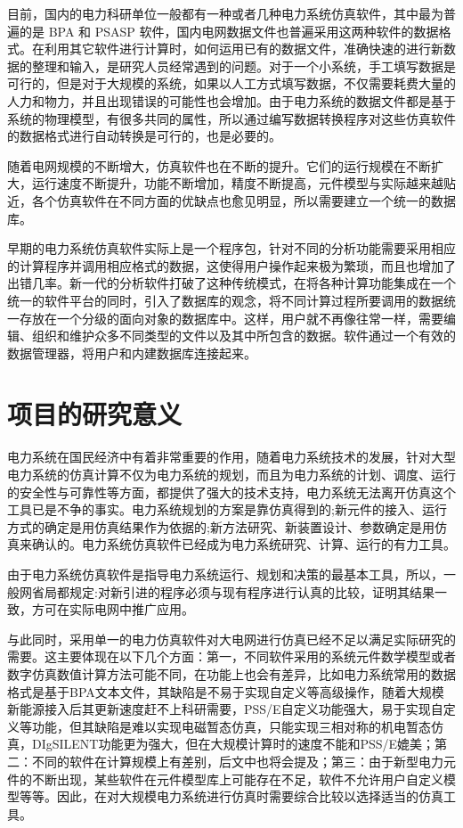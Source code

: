 目前，国内的电力科研单位一般都有一种或者几种电力系统仿真软件，其中最为普遍的是 BPA 和 PSASP 软件，国内电网数据文件也普遍采用这两种软件的数据格式。在利用其它软件进行计算时，如何运用已有的数据文件，准确快速的进行新数据的整理和输入，是研究人员经常遇到的问题。对于一个小系统，手工填写数据是可行的，但是对于大规模的系统，如果以人工方式填写数据，不仅需要耗费大量的人力和物力，并且出现错误的可能性也会增加。由于电力系统的数据文件都是基于系统的物理模型，有很多共同的属性，所以通过编写数据转换程序对这些仿真软件的数据格式进行自动转换是可行的，也是必要的。

随着电网规模的不断增大，仿真软件也在不断的提升。它们的运行规模在不断扩大，运行速度不断提升，功能不断增加，精度不断提高，元件模型与实际越来越贴近，各个仿真软件在不同方面的优缺点也愈见明显，所以需要建立一个统一的数据库。

早期的电力系统仿真软件实际上是一个程序包，针对不同的分析功能需要采用相应的计算程序并调用相应格式的数据，这使得用户操作起来极为繁琐，而且也增加了出错几率。新一代的分析软件打破了这种传统模式，在将各种计算功能集成在一个统一的软件平台的同时，引入了数据库的观念，将不同计算过程所要调用的数据统一存放在一个分级的面向对象的数据库中。这样，用户就不再像往常一样，需要编辑、组织和维护众多不同类型的文件以及其中所包含的数据。软件通过一个有效的数据管理器，将用户和内建数据库连接起来。

\section{项目的研究意义}

电力系统在国民经济中有着非常重要的作用，随着电力系统技术的发展，针对大型电力系统的仿真计算不仅为电力系统的规划，而且为电力系统的计划、调度、运行的安全性与可靠性等方面，都提供了强大的技术支持，电力系统无法离开仿真这个工具已是不争的事实。电力系统规划的方案是靠仿真得到的;新元件的接入、运行方式的确定是用仿真结果作为依据的;新方法研究、新装置设计、参数确定是用仿真来确认的。电力系统仿真软件已经成为电力系统研究、计算、运行的有力工具。

由于电力系统仿真软件是指导电力系统运行、规划和决策的最基本工具，所以，一般网省局都规定:对新引进的程序必须与现有程序进行认真的比较，证明其结果一致，方可在实际电网中推广应用。

与此同时，采用单一的电力仿真软件对大电网进行仿真已经不足以满足实际研究的需要。这主要体现在以下几个方面：第一，不同软件采用的系统元件数学模型或者数字仿真数值计算方法可能不同，在功能上也会有差异，比如电力系统常用的数据格式是基于BPA文本文件，其缺陷是不易于实现自定义等高级操作，随着大规模新能源接入后其更新速度赶不上科研需要，PSS/E自定义功能强大，易于实现自定义等功能，但其缺陷是难以实现电磁暂态仿真，只能实现三相对称的机电暂态仿真，DIgSILENT功能更为强大，但在大规模计算时的速度不能和PSS/E媲美；第二：不同的软件在计算规模上有差别，后文中也将会提及；第三：由于新型电力元件的不断出现，某些软件在元件模型库上可能存在不足，软件不允许用户自定义模型等等。因此，在对大规模电力系统进行仿真时需要综合比较以选择适当的仿真工具。

